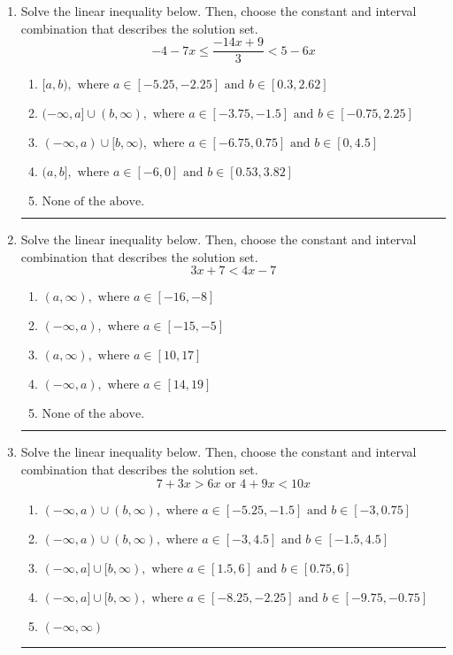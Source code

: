 \documentclass[14pt]{extbook}
\newcommand{\litem}[1]{\item#1\hspace*{-1cm}\rule{\textwidth}{0.4pt}}
\begin{document}
\begin{enumerate}
{\begin{enumerate}[label=\Alph*.]
\end{enumerate} }
\litem{
Solve the linear inequality below. Then, choose the constant and interval combination that describes the solution set.\[ -4 - 7 x \leq \frac{-14 x + 9}{3} < 5 - 6 x \]\begin{enumerate}[label=\Alph*.]
\item \( [a, b), \text{ where } a \in [-5.25, -2.25] \text{ and } b \in [0.3, 2.62] \)
\item \( (-\infty, a] \cup (b, \infty), \text{ where } a \in [-3.75, -1.5] \text{ and } b \in [-0.75, 2.25] \)
\item \( (-\infty, a) \cup [b, \infty), \text{ where } a \in [-6.75, 0.75] \text{ and } b \in [0, 4.5] \)
\item \( (a, b], \text{ where } a \in [-6, 0] \text{ and } b \in [0.53, 3.82] \)
\item \( \text{None of the above.} \)

\end{enumerate} }
\litem{
Solve the linear inequality below. Then, choose the constant and interval combination that describes the solution set.\[ 3x + 7 < 4x -7 \]\begin{enumerate}[label=\Alph*.]
\item \( (a, \infty), \text{ where } a \in [-16, -8] \)
\item \( (-\infty, a), \text{ where } a \in [-15, -5] \)
\item \( (a, \infty), \text{ where } a \in [10, 17] \)
\item \( (-\infty, a), \text{ where } a \in [14, 19] \)
\item \( \text{None of the above}. \)

\end{enumerate} }
\litem{
Solve the linear inequality below. Then, choose the constant and interval combination that describes the solution set.\[ 7 + 3 x > 6 x \text{ or } 4 + 9 x < 10 x \]\begin{enumerate}[label=\Alph*.]
\item \( (-\infty, a) \cup (b, \infty), \text{ where } a \in [-5.25, -1.5] \text{ and } b \in [-3, 0.75] \)
\item \( (-\infty, a) \cup (b, \infty), \text{ where } a \in [-3, 4.5] \text{ and } b \in [-1.5, 4.5] \)
\item \( (-\infty, a] \cup [b, \infty), \text{ where } a \in [1.5, 6] \text{ and } b \in [0.75, 6] \)
\item \( (-\infty, a] \cup [b, \infty), \text{ where } a \in [-8.25, -2.25] \text{ and } b \in [-9.75, -0.75] \)
\item \( (-\infty, \infty) \)

\end{enumerate} }
\end{enumerate}
\end{document}

